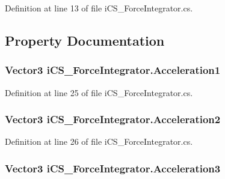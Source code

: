 Definition at line 13 of file i\+C\+S\+\_\+\+Force\+Integrator.\+cs.



\subsection{Property Documentation}
\hypertarget{classi_c_s___force_integrator_a3d786a1848075460fbf115ee6ab017f1}{
\subsubsection[{Acceleration1}]{\setlength{\rightskip}{0pt plus 5cm}Vector3 i\+C\+S\+\_\+\+Force\+Integrator.\+Acceleration1\hspace{0.3cm}{\ttfamily [set]}}}\label{classi_c_s___force_integrator_a3d786a1848075460fbf115ee6ab017f1}


Definition at line 25 of file i\+C\+S\+\_\+\+Force\+Integrator.\+cs.

\hypertarget{classi_c_s___force_integrator_a43e5c8ee1a0da0b4c5473fdce906c383}{
\subsubsection[{Acceleration2}]{\setlength{\rightskip}{0pt plus 5cm}Vector3 i\+C\+S\+\_\+\+Force\+Integrator.\+Acceleration2\hspace{0.3cm}{\ttfamily [set]}}}\label{classi_c_s___force_integrator_a43e5c8ee1a0da0b4c5473fdce906c383}


Definition at line 26 of file i\+C\+S\+\_\+\+Force\+Integrator.\+cs.

\hypertarget{classi_c_s___force_integrator_a811ae6403be08cbf53da477c09b0c2c4}{
\subsubsection[{Acceleration3}]{\setlength{\rightskip}{0pt plus 5cm}Vector3 i\+C\+S\+\_\+\+Force\+Integrator.\+Acceleration3\hspace{0.3cm}{\ttfamily [set]}}}\label{classi_c_s___force_integrator_a811ae6403be08cbf53da477c09b0c2c4}


